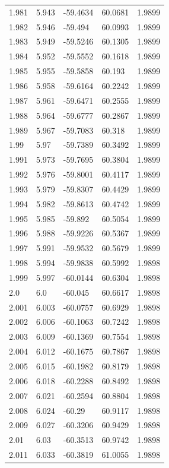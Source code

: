 \begin{tabular}{lllll}
1.981 & 5.943 & -59.4634 & 60.0681 & 1.9899 \\
1.982 & 5.946 & -59.494 & 60.0993 & 1.9899 \\
1.983 & 5.949 & -59.5246 & 60.1305 & 1.9899 \\
1.984 & 5.952 & -59.5552 & 60.1618 & 1.9899 \\
1.985 & 5.955 & -59.5858 & 60.193 & 1.9899 \\
1.986 & 5.958 & -59.6164 & 60.2242 & 1.9899 \\
1.987 & 5.961 & -59.6471 & 60.2555 & 1.9899 \\
1.988 & 5.964 & -59.6777 & 60.2867 & 1.9899 \\
1.989 & 5.967 & -59.7083 & 60.318 & 1.9899 \\
1.99 & 5.97 & -59.7389 & 60.3492 & 1.9899 \\
1.991 & 5.973 & -59.7695 & 60.3804 & 1.9899 \\
1.992 & 5.976 & -59.8001 & 60.4117 & 1.9899 \\
1.993 & 5.979 & -59.8307 & 60.4429 & 1.9899 \\
1.994 & 5.982 & -59.8613 & 60.4742 & 1.9899 \\
1.995 & 5.985 & -59.892 & 60.5054 & 1.9899 \\
1.996 & 5.988 & -59.9226 & 60.5367 & 1.9899 \\
1.997 & 5.991 & -59.9532 & 60.5679 & 1.9899 \\
1.998 & 5.994 & -59.9838 & 60.5992 & 1.9898 \\
1.999 & 5.997 & -60.0144 & 60.6304 & 1.9898 \\
2.0 & 6.0 & -60.045 & 60.6617 & 1.9898 \\
2.001 & 6.003 & -60.0757 & 60.6929 & 1.9898 \\
2.002 & 6.006 & -60.1063 & 60.7242 & 1.9898 \\
2.003 & 6.009 & -60.1369 & 60.7554 & 1.9898 \\
2.004 & 6.012 & -60.1675 & 60.7867 & 1.9898 \\
2.005 & 6.015 & -60.1982 & 60.8179 & 1.9898 \\
2.006 & 6.018 & -60.2288 & 60.8492 & 1.9898 \\
2.007 & 6.021 & -60.2594 & 60.8804 & 1.9898 \\
2.008 & 6.024 & -60.29 & 60.9117 & 1.9898 \\
2.009 & 6.027 & -60.3206 & 60.9429 & 1.9898 \\
2.01 & 6.03 & -60.3513 & 60.9742 & 1.9898 \\
2.011 & 6.033 & -60.3819 & 61.0055 & 1.9898 \\

\end{tabular}
